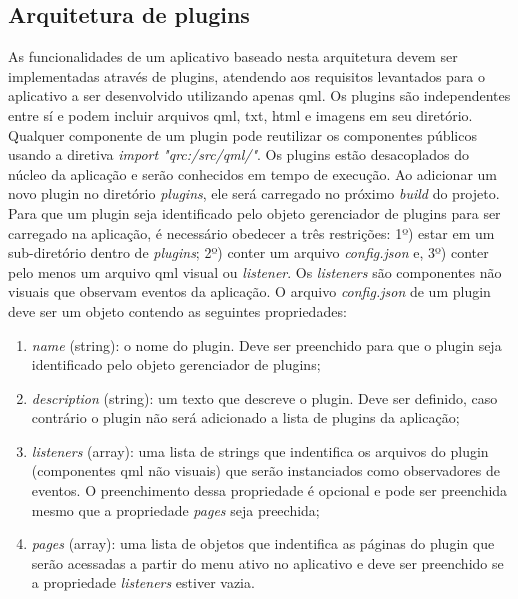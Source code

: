 \subsection{Arquitetura de plugins}
As funcionalidades de um aplicativo baseado nesta arquitetura devem ser implementadas através de plugins, atendendo aos requisitos levantados para o aplicativo a ser desenvolvido utilizando apenas qml. Os plugins são independentes entre sí e podem incluir arquivos qml, txt, html e imagens em seu diretório. Qualquer componente de um plugin pode reutilizar os componentes públicos usando a diretiva \textit{import "qrc:/src/qml/"}. Os plugins estão desacoplados do núcleo da aplicação e serão conhecidos em tempo de execução. Ao adicionar um novo plugin no diretório \textit{plugins}, ele será carregado no próximo \textit{build} do projeto. Para que um plugin seja identificado pelo objeto gerenciador de plugins para ser carregado na aplicação, é necessário obedecer a três restrições: 1º) estar em um sub-diretório dentro de \textit{plugins}; 2º) conter um arquivo \textit{config.json} e, 3º) conter pelo menos um arquivo qml visual ou \textit{listener}. Os \textit{listeners} são componentes não visuais que observam eventos da aplicação. O arquivo \textit{config.json} de um plugin deve ser um objeto contendo as seguintes propriedades:  
\begin{enumerate}
	\item \textit{name} (string): o nome do plugin. Deve ser preenchido para que o plugin seja identificado pelo objeto gerenciador de plugins;

	\item \textit{description} (string): um texto que descreve o plugin. Deve ser definido, caso contrário o plugin não será adicionado a lista de plugins da aplicação;

	\item \textit{listeners} (array): uma lista de strings que indentifica os arquivos do plugin (componentes qml não visuais) que serão instanciados como observadores de eventos. O preenchimento dessa propriedade é opcional e pode ser preenchida mesmo que a propriedade \textit{pages} seja preechida;

	\item \textit{pages} (array): uma lista de objetos que indentifica as páginas do plugin que serão acessadas a partir do menu ativo no aplicativo e deve ser preenchido se a propriedade \textit{listeners} estiver vazia.

\end{enumerate}

